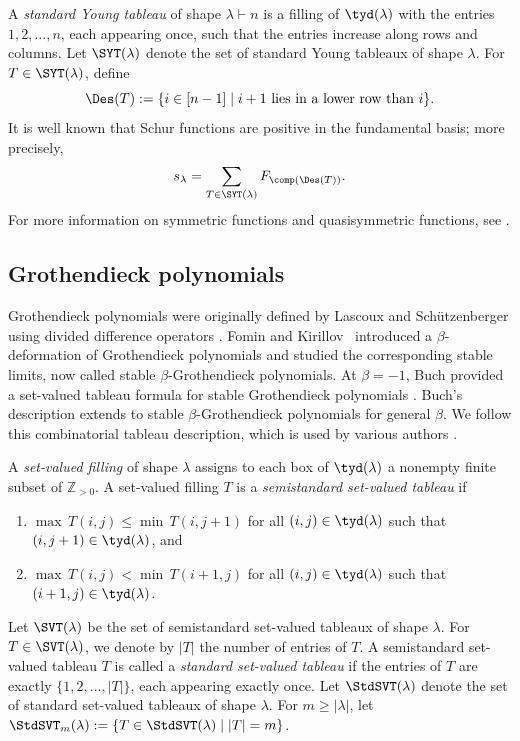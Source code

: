 \documentclass[12pt, reqno]{amsart}
\numberwithin{equation}{section}
\numberwithin{figure}{section}
\numberwithin{table}{section}
\theoremstyle{definition}
\def\Z{\mathbb Z}
\begin{document}
A \emph{standard Young tableau} of shape $\lambda\vdash n$ is a filling of $\tyd(\lambda)$ with the entries $1,2,\ldots,n$, each appearing once, such that the entries increase along rows and columns. Let $\SYT(\lambda)$ denote the set of standard Young tableaux of shape $\lambda$. For $T\in\SYT(\lambda)$, define
\[
\Des(T):=\{i\in[n-1]\mid i+1\text{ lies in a lower row than }i\}.
\]
It is well known that Schur functions are positive in the fundamental basis; more precisely,
\begin{align}\label{eq: F expansion of Schur}
s_\lambda=\sum_{T\in\SYT(\lambda)}F_{\comp(\Des(T))}.
\end{align}
For more information on symmetric functions and quasisymmetric functions, see \cite[Chapter 7]{Stanley99}.



\subsection{Grothendieck polynomials}
\label{subsec: groth prelim}


Grothendieck polynomials were originally defined by Lascoux and Sch\"utzenberger using divided difference operators \cite{LS82}.
Fomin and Kirillov~\cite{FK94} introduced a $\beta$-deformation of Grothendieck polynomials and studied the corresponding stable limits, now called stable $\beta$-Grothendieck polynomials.
At $\beta=-1$, Buch provided a set-valued tableau formula for stable Grothendieck polynomials \cite{Buch02}.
Buch's description extends to stable $\beta$-Grothendieck polynomials for general $\beta$.
We follow this combinatorial tableau description, which is used by various authors \cite{MPS21,MPPS20,PS19}.


A \emph{set-valued filling} of shape $\lambda$ assigns to each box of $\tyd(\lambda)$ a nonempty finite subset of $\Z_{>0}$. 
A set-valued filling $T$ is a \emph{semistandard set-valued tableau} if
\begin{enumerate}[label = -, leftmargin = 4ex]
\item
$\max \, T(i,j) \le \min \, T(i,j+1)$ for all $(i,j) \in \tyd(\lambda)$ such that $(i,j+1) \in \tyd(\lambda)$, and
\item
$\max \, T(i,j)< \min \, T(i+1,j)$ for all $(i,j) \in \tyd(\lambda)$ such that $(i+1,j) \in \tyd(\lambda)$.
\end{enumerate}
Let $\SVT(\lambda)$ be the set of semistandard set-valued tableaux of shape $\lambda$.
For $T \in \SVT(\lambda)$, we denote by $|T|$ the number of entries of $T$.
A semistandard set-valued tableau $T$ is called a \emph{standard set-valued tableau} if the entries of $T$ are exactly $\{1,2,\ldots, |T| \}$, each appearing exactly once.
Let $\StdSVT(\lambda)$ denote the set of standard set-valued tableaux of shape $\lambda$.
For $m \ge |\lambda|$, let $\StdSVT_m(\lambda):=\{T\in\StdSVT(\lambda)\mid |T|=m\}$.
\end{document}
